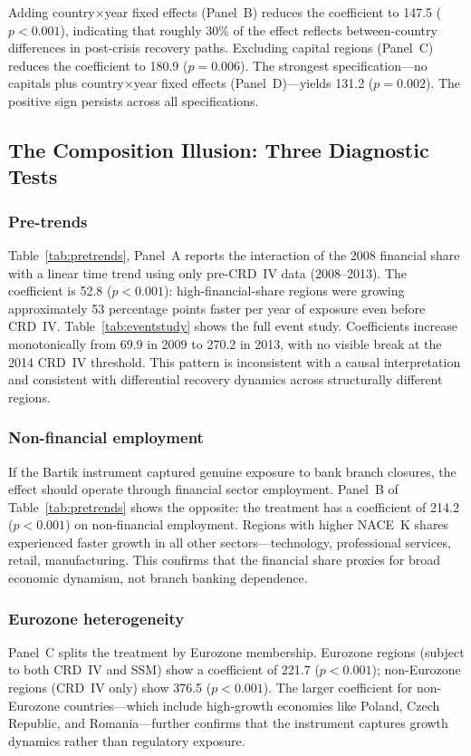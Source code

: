\documentclass[12pt]{article}
\begin{document}
Adding country$\times$year fixed effects (Panel~B) reduces the coefficient to 147.5 ($p < 0.001$), indicating that roughly 30\% of the effect reflects between-country differences in post-crisis recovery paths. Excluding capital regions (Panel~C) reduces the coefficient to 180.9 ($p = 0.006$). The strongest specification---no capitals plus country$\times$year fixed effects (Panel~D)---yields 131.2 ($p = 0.002$). The positive sign persists across all specifications.



\subsection{The Composition Illusion: Three Diagnostic Tests}

\subsubsection*{Pre-trends} Table~\ref{tab:pretrends}, Panel~A reports the interaction of the 2008 financial share with a linear time trend using only pre-CRD~IV data (2008--2013). The coefficient is 52.8 ($p < 0.001$): high-financial-share regions were growing approximately 53 percentage points faster per year of exposure even before CRD~IV. Table~\ref{tab:eventstudy} shows the full event study. Coefficients increase monotonically from 69.9 in 2009 to 270.2 in 2013, with no visible break at the 2014 CRD~IV threshold. This pattern is inconsistent with a causal interpretation and consistent with differential recovery dynamics across structurally different regions.

\subsubsection*{Non-financial employment} If the Bartik instrument captured genuine exposure to bank branch closures, the effect should operate through financial sector employment. Panel~B of Table~\ref{tab:pretrends} shows the opposite: the treatment has a coefficient of 214.2 ($p < 0.001$) on non-financial employment. Regions with higher NACE~K shares experienced faster growth in all other sectors---technology, professional services, retail, manufacturing. This confirms that the financial share proxies for broad economic dynamism, not branch banking dependence.

\subsubsection*{Eurozone heterogeneity} Panel~C splits the treatment by Eurozone membership. Eurozone regions (subject to both CRD~IV and SSM) show a coefficient of 221.7 ($p < 0.001$); non-Eurozone regions (CRD~IV only) show 376.5 ($p < 0.001$). The larger coefficient for non-Eurozone countries---which include high-growth economies like Poland, Czech Republic, and Romania---further confirms that the instrument captures growth dynamics rather than regulatory exposure.
\end{document}
